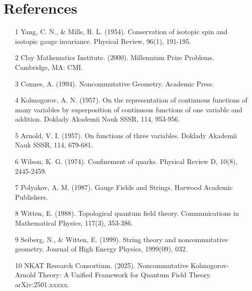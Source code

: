 \documentclass[12pt,a4paper]{article}
\begin{document}
\section{References}
\begin{enumerate}
\item [1] Yang, C. N., & Mills, R. L. (1954). Conservation of isotopic spin and isotopic gauge invariance. Physical Review, 96(1), 191-195.
\item [2] Clay Mathematics Institute. (2000). Millennium Prize Problems. Cambridge, MA: CMI.
\item [3] Connes, A. (1994). Noncommutative Geometry. Academic Press.
\item [4] Kolmogorov, A. N. (1957). On the representation of continuous functions of many variables by superposition of continuous functions of one variable and addition. Doklady Akademii Nauk SSSR, 114, 953-956.
\item [5] Arnold, V. I. (1957). On functions of three variables. Doklady Akademii Nauk SSSR, 114, 679-681.
\item [6] Wilson, K. G. (1974). Confinement of quarks. Physical Review D, 10(8), 2445-2459.
\item [7] Polyakov, A. M. (1987). Gauge Fields and Strings. Harwood Academic Publishers.
\item [8] Witten, E. (1988). Topological quantum field theory. Communications in Mathematical Physics, 117(3), 353-386.
\item [9] Seiberg, N., & Witten, E. (1999). String theory and noncommutative geometry. Journal of High Energy Physics, 1999(09), 032.
\item [10] NKAT Research Consortium. (2025). Noncommutative Kolmogorov-Arnold Theory: A Unified Framework for Quantum Field Theory. arXiv:2501.xxxxx.

\end{enumerate}
\end{document}
